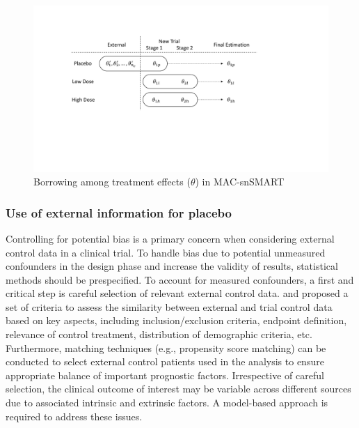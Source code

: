 \begin{figure}
\centering
\includegraphics[width=14cm]{chapters/figures/theta_diagram.pdf}
\caption{Borrowing among treatment effects ($\theta$) in MAC-snSMART}
\label{fig:theta_diagram}
\end{figure}

\subsubsection{Use of external information for placebo} \label{sec:placebo}

Controlling for potential bias is a primary concern when considering external control data in a clinical trial. To handle bias due to potential unmeasured confounders in the design phase and increase the validity of results, statistical methods should be prespecified. To account for measured confounders, a first and critical step is careful selection of relevant external control data. \cite{pocock1976combination} and \cite{lim2018minimizing} proposed a set of criteria to assess the similarity between external and trial control data based on key aspects, including inclusion/exclusion criteria, endpoint definition, relevance of control treatment, distribution of demographic criteria, etc. Furthermore, matching techniques (e.g., propensity score matching) can be conducted to select external control patients used in the analysis to ensure appropriate balance of important prognostic factors. Irrespective of careful selection, the clinical outcome of interest may be variable across different sources due to associated intrinsic and extrinsic factors. A model-based approach is required to address these issues.  

